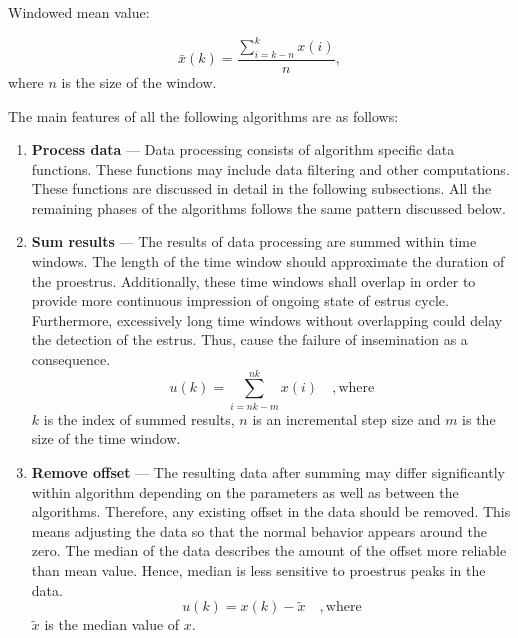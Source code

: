 \documentclass[english,12pt,a4paper,pdftex,elec,utf8]{aaltothesis}
\begin{document}
Windowed mean value:

\begin{equation}
\bar{x}(k) = \frac{ \sum\limits^{k}_{i = k - n} x(i)}{n} \mathrm{,}
\end{equation} where $n$ is the size of the window.


The main features of all the following algorithms are as follows:
\begin{enumerate}

\item \textbf{Process data} --- Data processing consists of algorithm specific data functions. These functions may include data filtering and other computations. These functions are discussed in detail in the following subsections. All the remaining phases of the algorithms follows the same pattern discussed below. \\

\item \textbf{Sum results} --- The results of data processing are summed within time windows. The length of the time window should approximate the duration of the proestrus. Additionally, these time windows shall overlap in order to provide more continuous impression of ongoing state of estrus cycle. Furthermore, excessively long time windows without overlapping could delay the detection of the estrus. Thus, cause the failure of insemination as a consequence. \\

\begin{equation}
u(k) =\sum\limits^{nk}_{i = nk - m} x(i) \mathrm{\hspace{1em}, where}
\end{equation}
$k$ is the index of summed results, $n$ is an incremental step size and $m$ is the size of the time window.

\item \textbf{Remove offset} --- The resulting data after summing may differ significantly within algorithm depending on the parameters as well as between the algorithms. Therefore, any existing offset in the data should be removed. This means adjusting the data so that the normal behavior appears around the zero. The median of the data describes the amount of the offset more reliable than mean value. Hence, median is less sensitive to proestrus peaks in the data.  \\

\begin{equation}
u(k) = x(k) - \tilde{x} \mathrm{\hspace{1em}, where}
\end{equation}
$\tilde{x}$ is the median value of $x$.


\end{enumerate}
\end{document}
